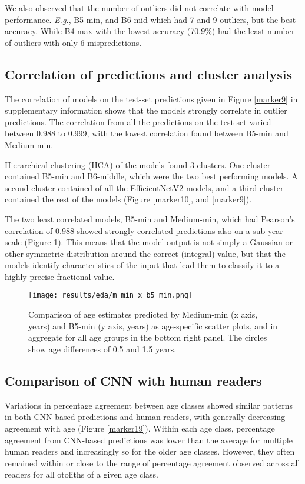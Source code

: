 \documentclass[10pt,letterpaper]{article}
\begin{document}
We also observed that the number of  outliers did not correlate with model performance. \textit{E.g.}, B5-min, and B6-mid which had 7 and 9 outliers, but the best  accuracy. While B4-max with the lowest accuracy (70.9\%) had the least number of outliers with only 6 mispredictions.

\subsection{Correlation of predictions and cluster analysis}

The correlation of models on the test-set predictions given in Figure \ref{marker9} in supplementary information shows that the models strongly correlate in outlier predictions. 
The correlation from all the predictions on the test set varied between 0.988 to 0.999, with the lowest correlation found between B5-min and Medium-min. 

Hierarchical clustering (HCA) of the models found 3 clusters. One cluster contained B5-min and B6-middle, which were the two best performing models. A second cluster contained of all the EfficientNetV2 models, and a third cluster contained the rest of the models (Figure \ref{marker10}, and \ref{marker9}).

The two least correlated models, B5-min and Medium-min, which had Pearson's correlation of 0.988 showed strongly correlated predictions also on a sub-year scale (Figure \ref{marker12}).  This means that the model output is not simply a Gaussian or other symmetric distribution around the correct (integral) value, but that the models identify characteristics of the input that lead them to classify it to a highly precise fractional value.

\begin{figure}[hbtp!]
  \centering
  \texttt{[image: results/eda/m\_min\_x\_b5\_min.png]}
    \caption{Comparison of age estimates predicted by Medium-min (x axis, years) and B5-min (y axis, years) as age-specific scatter plots, and in aggregate for all age groups  in the bottom right panel.  The circles show age differences of 0.5 and 1.5 years.}
  \label{marker12}
\end{figure}

\subsection{Comparison of CNN with human readers}
Variations in percentage agreement between age classes showed similar patterns in both CNN-based predictions and human readers, with generally decreasing agreement with age (Figure \ref{marker19}). Within each age class, percentage agreement from CNN-based predictions was lower than the average for multiple human readers and increasingly so for the older age classes. However, they often remained within or close to the range of percentage agreement observed across all readers for all otoliths of a given age class. 
\end{document}
